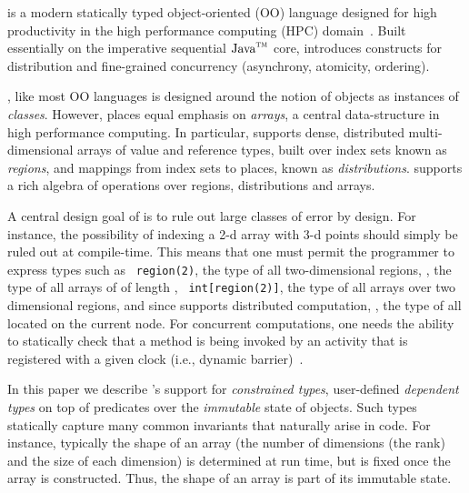 
%

%
%
%

\Xten{} is a modern statically typed object-oriented (OO) language
designed for high productivity in the high performance computing (HPC)
domain~\cite{X10}. Built essentially on the imperative sequential
$\mbox{Java}^{\mbox{\scriptsize\sc tm}}$ core, \Xten{} introduces constructs for
distribution and fine-grained concurrency (asynchrony, atomicity,
ordering).

\Xten{}, like most OO languages is designed around
the notion of objects as instances of {\em classes}. However, \Xten{}
places equal emphasis on {\em arrays}, a central data-structure in
high performance computing. In particular, \Xten{} supports dense,
distributed multi-dimensional arrays of value and reference types,
built over index sets known as {\em regions}, and mappings from index
sets to places, known as {\em distributions}.  \Xten{} supports a rich
algebra of operations over regions, distributions and arrays.

A central design goal of \Xten{} is to rule out large classes of error
by design. For instance, the possibility of indexing a 2-d array with 3-d
points should simply be ruled out at compile-time. This means that one
must permit the programmer to express types such as {\tt
region(2)}, the type of all two-dimensional regions, , the
type of all arrays of  of length , {\tt
int[region(2)]}, the type of all  arrays over two dimensional
regions, and since \Xten{} supports distributed computation, , the type of all  located on the
current node. For concurrent computations, one needs the ability to
statically check that a method is being invoked by an activity that is
registered with a given clock (i.e., dynamic barrier)~\cite{X10}.

In this paper we describe {\Xten}'s support for {\em
constrained types}, user-defined {\em dependent types}
on top of predicates over the {\em immutable}
state of objects. Such types statically capture many common invariants
that naturally arise in code. For instance, typically the shape of an
array (the number of dimensions (the rank) and the size of each dimension)
is determined at
run time, but is fixed once the array is constructed. Thus, the shape of an
array is part of its immutable state.

